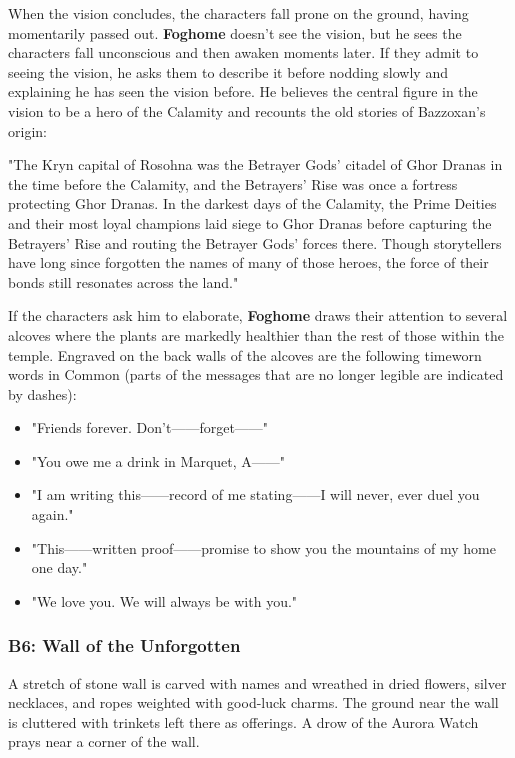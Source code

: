 \documentclass[10pt,a4paper,twoside,fancy,bg=print,twocolumn,openany,nodeprecatedcode]{dndbook}
\begin{document}
When the vision concludes, the characters fall prone on the ground, having momentarily passed out. \textbf{Foghome} doesn't see the vision, but he sees the characters fall unconscious and then awaken moments later. If they admit to seeing the vision, he asks them to describe it before nodding slowly and explaining he has seen the vision before. He believes the central figure in the vision to be a hero of the Calamity and recounts the old stories of Bazzoxan's origin:

\begin{DndReadAloud}{}
"The Kryn capital of Rosohna was the Betrayer Gods' citadel of Ghor Dranas in the time before the Calamity, and the Betrayers' Rise was once a fortress protecting Ghor Dranas. In the darkest days of the Calamity, the Prime Deities and their most loyal champions laid siege to Ghor Dranas before capturing the Betrayers' Rise and routing the Betrayer Gods' forces there. Though storytellers have long since forgotten the names of many of those heroes, the force of their bonds still resonates across the land."

\end{DndReadAloud}

If the characters ask him to elaborate, \textbf{Foghome} draws their attention to several alcoves where the plants are markedly healthier than the rest of those within the temple. Engraved on the back walls of the alcoves are the following timeworn words in Common (parts of the messages that are no longer legible are indicated by dashes):


\begin{itemize}
\item "Friends forever. Don't——forget——"
\item "You owe me a drink in Marquet, A——"
\item "I am writing this——record of me stating——I will never, ever duel you again."
\item "This——written proof——promise to show you the mountains of my home one day."
\item "We love you. We will always be with you."
\end{itemize}

\subsubsection{B6: Wall of the Unforgotten}
\begin{DndReadAloud}{}
A stretch of stone wall is carved with names and wreathed in dried flowers, silver necklaces, and ropes weighted with good-luck charms. The ground near the wall is cluttered with trinkets left there as offerings. A drow of the Aurora Watch prays near a corner of the wall.

\end{DndReadAloud}
\end{document}
